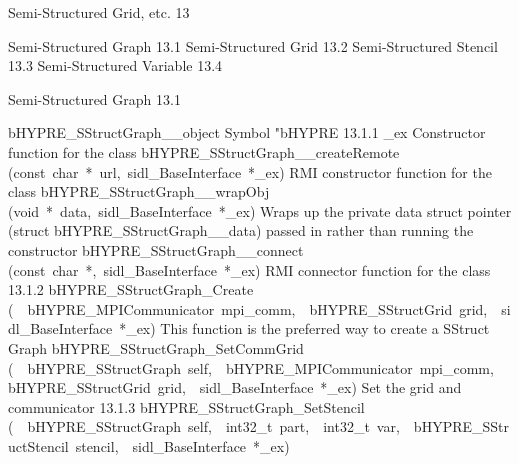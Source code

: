 \documentclass{article}
\begin{document}
\begin{cxxentry}
{}
        {Semi-Structured Grid, etc.}
        {}
        {
}
        {13}
\begin{cxxnames}
\cxxitem{}
        {Semi-Structured Graph}
        {}
        {
}
        {13.1}
\cxxitem{}
        {Semi-Structured Grid}
        {}
        {
}
        {13.2}
\cxxitem{}
        {Semi-Structured Stencil}
        {}
        {
}
        {13.3}
\cxxitem{}
        {Semi-Structured Variable}
        {}
        {
}
        {13.4}
\end{cxxnames}
\begin{cxxentry}
{}
        {Semi-Structured Graph}
        {}
        {
}
        {13.1}
\begin{cxxnames}
        {bHYPRE\_SStructGraph\_\_object}
        {}
        {
Symbol "bHYPRE}
        {13.1.1}
        {\_ex}
        {}
        {
Constructor function for the class}
        {}
\label{cxx.13.1.9}
        {bHYPRE\_SStructGraph\_\_createRemote}
        {(const\ char\ *\ url,\ sidl\_BaseInterface\ *\_ex)}
        {
RMI constructor function for the class}
        {}
\label{cxx.13.1.10}
        {bHYPRE\_SStructGraph\_\_wrapObj}
        {(void\ *\ data,\ sidl\_BaseInterface\ *\_ex)}
        {
Wraps up the private data struct pointer (struct bHYPRE\_SStructGraph\_\_data) passed in rather than running the constructor}
        {}
\label{cxx.13.1.11}
        {bHYPRE\_SStructGraph\_\_connect}
        {(const\ char\ *,\ sidl\_BaseInterface\ *\_ex)}
        {
RMI connector function for the class}
        {13.1.2}
        {bHYPRE\_SStructGraph\_Create}
        {(\ \ bHYPRE\_MPICommunicator\ mpi\_comm,\ \ bHYPRE\_SStructGrid\ grid,\ \ sidl\_BaseInterface\ *\_ex)}
        {
This function is the preferred way to create a SStruct Graph}
        {}
\label{cxx.13.1.12}
        {bHYPRE\_SStructGraph\_SetCommGrid}
        {(\ \ bHYPRE\_SStructGraph\ self,\ \ bHYPRE\_MPICommunicator\ mpi\_comm,\ \ bHYPRE\_SStructGrid\ grid,\ \ sidl\_BaseInterface\ *\_ex)}
        {
Set the grid and communicator}
        {13.1.3}
        {bHYPRE\_SStructGraph\_SetStencil}
        {(\ \ bHYPRE\_SStructGraph\ self,\ \ int32\_t\ part,\ \ int32\_t\ var,\ \ bHYPRE\_SStructStencil\ stencil,\ \ sidl\_BaseInterface\ *\_ex)}

\end{cxxnames}
\end{cxxentry}
\end{cxxentry}
\end{document}
